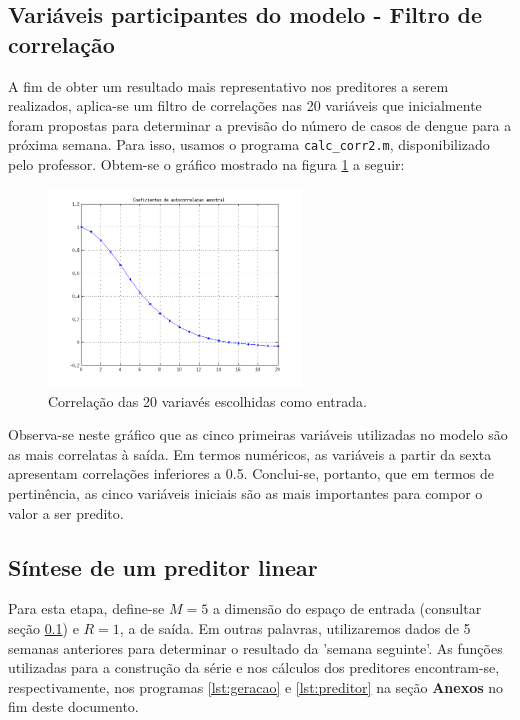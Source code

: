 	\FloatBarrier

\subsection{Variáveis participantes do modelo - Filtro de correlação}
 \label{sec:corr}

A fim de obter um resultado mais representativo nos preditores a serem
realizados, aplica-se um filtro de correlações nas 20 variáveis que inicialmente
foram propostas para determinar a previsão do número de casos de dengue para a
próxima semana. Para isso, usamos o programa \texttt{calc\_corr2.m},
disponibilizado pelo professor. Obtem-se o gráfico mostrado na figura
\ref{fig:corr_variavel} a seguir:

	\begin{figure}[H]
			\centering
			  \includegraphics[width=0.60\textwidth]{image/corr_variaveis_preditor}
			  \caption{Correlação das 20 variavés escolhidas como entrada.} 
			  \label{fig:corr_variavel}
	\end{figure}
	
	\FloatBarrier
	
Observa-se neste gráfico que as cinco primeiras variáveis utilizadas no modelo
são as mais correlatas à saída. Em termos numéricos, as variáveis a partir da
sexta apresentam correlações inferiores a 0.5. Conclui-se, portanto, que em
termos de pertinência, as cinco variáveis iniciais são as mais importantes para
compor o valor a ser predito.

\subsection{Síntese de um preditor linear}
 
Para esta etapa, define-se \(M = 5\) a dimensão do espaço de entrada (consultar
seção \ref{sec:corr}) e \(R = 1\), a de saída. Em outras palavras, utilizaremos
dados de 5 semanas anteriores para determinar o resultado da 'semana seguinte'. As funções
utilizadas para a construção da série e nos cálculos dos preditores encontram-se, respectivamente, nos
programas \ref{lst:geracao} e \ref{lst:preditor} na seção
\textbf{Anexos} no fim deste documento.

